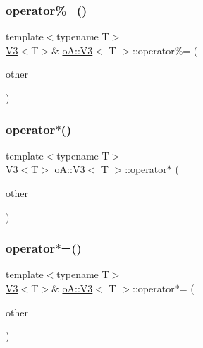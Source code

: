 \mbox{\label{structo_a_1_1_v3_ad311ac93d7c947c590a45320fbee26ac}} 
\subsubsection{\texorpdfstring{operator\%=()}{operator\%=()}}
{\footnotesize\ttfamily template$<$typename T$>$ \\
\mbox{\hyperlink{structo_a_1_1_v3}{V3}}$<$T$>$\& \mbox{\hyperlink{structo_a_1_1_v3}{o\+A\+::\+V3}}$<$ T $>$\+::operator\%= (\begin{DoxyParamCaption}\item[{const \mbox{\hyperlink{structo_a_1_1_v3}{o\+A\+::\+V3}}$<$ T $>$ \&}]{other }\end{DoxyParamCaption})\hspace{0.3cm}{\ttfamily [inline]}}

\mbox{\label{structo_a_1_1_v3_a6171d787358a1cffd89786d4f13578bb}} 
\subsubsection{\texorpdfstring{operator$\ast$()}{operator*()}}
{\footnotesize\ttfamily template$<$typename T$>$ \\
\mbox{\hyperlink{structo_a_1_1_v3}{V3}}$<$T$>$ \mbox{\hyperlink{structo_a_1_1_v3}{o\+A\+::\+V3}}$<$ T $>$\+::operator$\ast$ (\begin{DoxyParamCaption}\item[{const \mbox{\hyperlink{structo_a_1_1_v3}{o\+A\+::\+V3}}$<$ T $>$ \&}]{other }\end{DoxyParamCaption})\hspace{0.3cm}{\ttfamily [inline]}}

\mbox{\label{structo_a_1_1_v3_afa355bab009db6eae651e834cdaf9cc4}} 
\subsubsection{\texorpdfstring{operator$\ast$=()}{operator*=()}}
{\footnotesize\ttfamily template$<$typename T$>$ \\
\mbox{\hyperlink{structo_a_1_1_v3}{V3}}$<$T$>$\& \mbox{\hyperlink{structo_a_1_1_v3}{o\+A\+::\+V3}}$<$ T $>$\+::operator$\ast$= (\begin{DoxyParamCaption}\item[{const \mbox{\hyperlink{structo_a_1_1_v3}{o\+A\+::\+V3}}$<$ T $>$ \&}]{other }\end{DoxyParamCaption})\hspace{0.3cm}{\ttfamily [inline]}}

